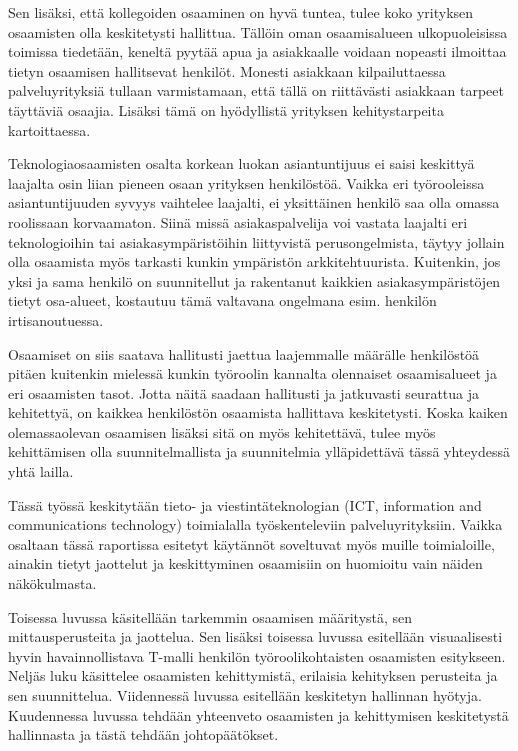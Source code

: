 \documentclass[a4paper,finnish,12pt]{article}
\begin{document}
Sen lisäksi, että kollegoiden osaaminen on hyvä tuntea, tulee koko yrityksen osaamisten olla keskitetysti hallittua. Tällöin oman osaamisalueen ulkopuoleisissa toimissa tiedetään, keneltä pyytää apua ja asiakkaalle voidaan nopeasti ilmoittaa tietyn osaamisen hallitsevat henkilöt. Monesti asiakkaan kilpailuttaessa palveluyrityksiä tullaan varmistamaan, että tällä on riittävästi asiakkaan tarpeet täyttäviä osaajia. Lisäksi tämä on hyödyllistä yrityksen kehitystarpeita kartoittaessa.

Teknologiaosaamisten osalta korkean luokan asiantuntijuus ei saisi keskittyä laajalta osin liian pieneen osaan yrityksen henkilöstöä. Vaikka eri työrooleissa asiantuntijuuden syvyys vaihtelee laajalti, ei yksittäinen henkilö saa olla omassa roolissaan korvaamaton. Siinä missä asiakaspalvelija voi vastata laajalti eri teknologioihin tai asiakasympäristöihin liittyvistä perusongelmista, täytyy jollain olla osaamista myös tarkasti kunkin ympäristön arkkitehtuurista. Kuitenkin, jos yksi ja sama henkilö on suunnitellut ja rakentanut kaikkien asiakasympäristöjen tietyt osa-alueet, kostautuu tämä valtavana ongelmana esim. henkilön irtisanoutuessa.

Osaamiset on siis saatava hallitusti jaettua laajemmalle määrälle henkilöstöä pitäen kuitenkin mielessä kunkin työroolin kannalta olennaiset osaamisalueet ja eri osaamisten tasot. Jotta näitä saadaan hallitusti ja jatkuvasti seurattua ja kehitettyä, on kaikkea henkilöstön osaamista hallittava keskitetysti. Koska kaiken olemassaolevan osaamisen lisäksi sitä on myös kehitettävä, tulee myös kehittämisen olla suunnitelmallista ja suunnitelmia ylläpidettävä tässä yhteydessä yhtä lailla.

Tässä työssä keskitytään tieto- ja viestintäteknologian (ICT, information and communications technology) toimialalla työskenteleviin palveluyrityksiin. Vaikka osaltaan tässä raportissa esitetyt käytännöt soveltuvat myös muille toimialoille, ainakin tietyt jaottelut ja keskittyminen osaamisiin on huomioitu vain näiden näkökulmasta.

Toisessa luvussa käsitellään tarkemmin osaamisen määritystä, sen mittausperusteita ja jaottelua. Sen lisäksi toisessa luvussa esitellään visuaalisesti hyvin havainnollistava T-malli henkilön työroolikohtaisten osaamisten esitykseen. Neljäs luku käsittelee osaamisten kehittymistä, erilaisia kehityksen perusteita ja sen suunnittelua. Viidennessä luvussa esitellään keskitetyn hallinnan hyötyja. Kuudennessa luvussa tehdään yhteenveto osaamisten ja kehittymisen keskitetystä hallinnasta ja tästä tehdään johtopäätökset.
\end{document}
